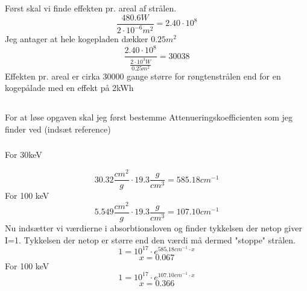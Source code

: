 \documentclass[a4paper,twoside]{article}
\begin{document}
\subsection{}
Først skal vi finde effekten pr. areal af strålen. 
\begin{equation*}
    \frac{480.6W}{2\cdot10^{-6}m^2}=2.40\cdot10^{8}

\end{equation*}
Jeg antager at hele kogepladen dækker $0.25 m^2$
\begin{equation*}
    \frac{2.40\cdot10^{8}}{\frac{2\cdot10^3W}{0.25m^2}}=30038
\end{equation*}
Effekten pr. areal er cirka 30000 gange større for røngtenstrålen end for en kogepålade med en effekt på 2kWh

\subsection{}
For at løse opgaven skal jeg først bestemme Attenueringskoefficienten som jeg finder ved (indsæt reference)
\subsubsection*{}For 30keV

\begin{equation*}
    30.32\frac{cm^2}{g}\cdot19.3\frac{g}{cm^3}=585.18cm^{-1}
\end{equation*}
For 100 keV
\begin{equation*}
    5.549\frac{cm^2}{g}\cdot19.3\frac{g}{cm^3}=107.10cm^{-1}
\end{equation*}
Nu indsætter vi værdierne i absorbtionsloven og finder tykkelsen der netop giver I=1. Tykkelsen der netop er større end den værdi må dermed "stoppe" strålen. 
\begin{equation*}
  1=10^{17}\cdot e^{585.18cm^{-1}\cdot x}
\end{equation*}
\begin{equation*}
    x=0.067
\end{equation*}
For 100 keV
\begin{equation*}
     1=10^{17}\cdot e^{107.10cm^{-1}\cdot x}
\end{equation*}
\begin{equation*}
    x=0.366
\end{equation*}
\newpage
\section{}
%
\end{document}
